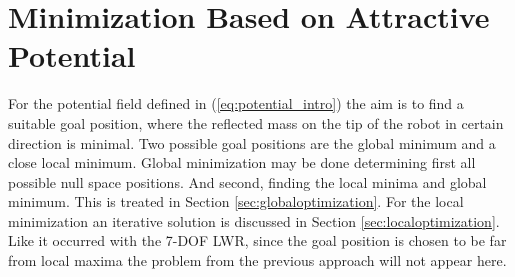 %
%
%














\section{Minimization Based on Attractive Potential}
\label{sec:Minimattractivepotential}




For the potential field  defined in (\ref{eq:potential_intro}) the aim is to find a suitable goal position, where the reflected mass on the tip of the robot in certain direction is minimal. Two possible goal positions are  the global minimum and a close local minimum. Global minimization may be done determining first all possible null space positions. And second,  finding the local minima and global minimum. This is treated in  Section \ref{sec:globaloptimization}. For the local minimization an iterative solution is discussed in  Section \ref{sec:localoptimization}.
Like it occurred with the 7-DOF LWR, since the goal position is chosen to be far from local maxima the problem from the previous approach will not appear here.


